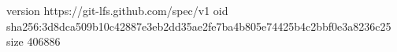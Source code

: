 version https://git-lfs.github.com/spec/v1
oid sha256:3d8dca509b10c42887e3eb2dd35ae2fe7ba4b805e74425b4c2bbf0e3a8236c25
size 406886
